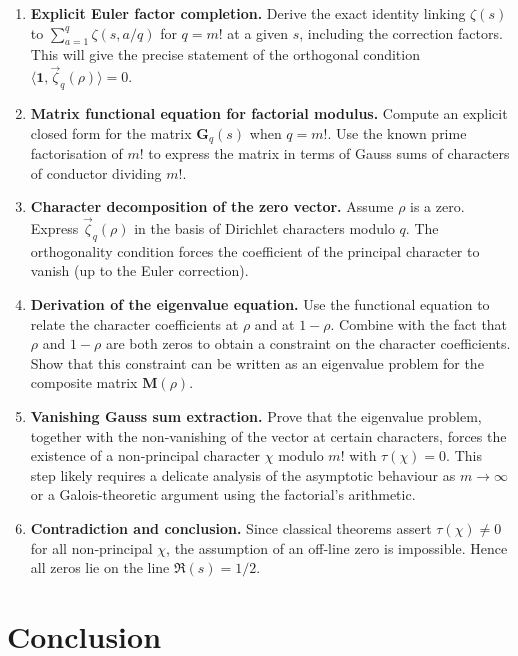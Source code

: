 \documentclass{article}
\theoremstyle{definition}
\begin{document}
\begin{enumerate}
\item \textbf{Explicit Euler factor completion.} Derive the exact identity linking \(\zeta(s)\) to \(\sum_{a=1}^q \zeta(s,a/q)\) for \(q=m!\) at a given \(s\), including the correction factors. This will give the precise statement of the orthogonal condition \(\langle \mathbf{1}, \vec{\zeta}_q(\rho) \rangle = 0\).

\item \textbf{Matrix functional equation for factorial modulus.} Compute an explicit closed form for the matrix \(\mathbf{G}_q(s)\) when \(q=m!\). Use the known prime factorisation of \(m!\) to express the matrix in terms of Gauss sums of characters of conductor dividing \(m!\).

\item \textbf{Character decomposition of the zero vector.} Assume \(\rho\) is a zero. Express \(\vec{\zeta}_q(\rho)\) in the basis of Dirichlet characters modulo \(q\). The orthogonality condition forces the coefficient of the principal character to vanish (up to the Euler correction).

\item \textbf{Derivation of the eigenvalue equation.} Use the functional equation to relate the character coefficients at \(\rho\) and at \(1-\rho\). Combine with the fact that \(\rho\) and \(1-\rho\) are both zeros to obtain a constraint on the character coefficients. Show that this constraint can be written as an eigenvalue problem for the composite matrix \(\mathbf{M}(\rho)\).

\item \textbf{Vanishing Gauss sum extraction.} Prove that the eigenvalue problem, together with the non‑vanishing of the vector at certain characters, forces the existence of a non‑principal character \(\chi\) modulo \(m!\) with \(\tau(\chi)=0\). This step likely requires a delicate analysis of the asymptotic behaviour as \(m\to\infty\) or a Galois-theoretic argument using the factorial's arithmetic.

\item \textbf{Contradiction and conclusion.} Since classical theorems assert \(\tau(\chi)\neq 0\) for all non‑principal \(\chi\), the assumption of an off‑line zero is impossible. Hence all zeros lie on the line \(\Re(s)=1/2\).
\end{enumerate}

\section{Conclusion}
\end{document}
